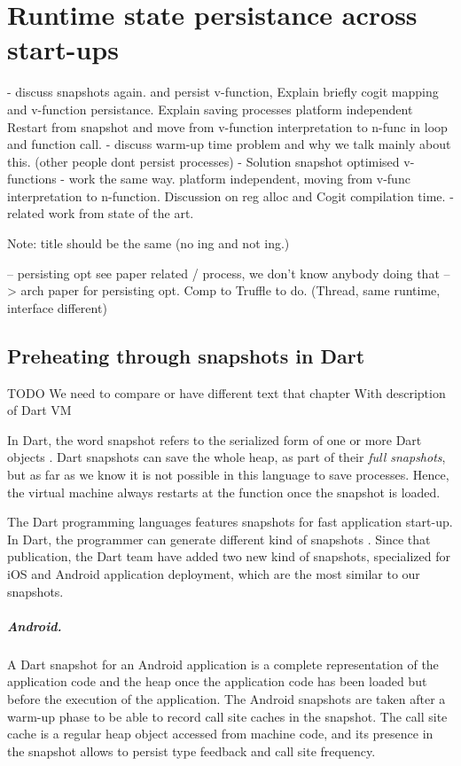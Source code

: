 \documentclass[a4paper,12pt,twoside]{../includes/ThesisStyle}
\begin{document}
\fi

\chapter{Runtime state persistance across start-ups}
\label{chap:persistance}
\minitoc

- discuss snapshots again. and persist v-function, 
Explain briefly cogit mapping and v-function persistance.
Explain saving processes
platform independent
Restart from snapshot and move from v-function interpretation to n-func in loop and function call.
- discuss warm-up time problem and why we talk mainly about this. (other people dont persist processes)
- Solution snapshot optimised v-functions - work the same way.
platform independent, moving from v-func interpretation to n-function.
Discussion on reg alloc and Cogit compilation time.
- related work
from state of the art.






Note: title should be the same (no ing and not ing.)

-- persisting opt see paper related / process, we don't know anybody doing that
--> arch paper for persisting opt. Comp to Truffle to do. (Thread, same runtime, interface different)

\section{Preheating through snapshots in Dart}

TODO
We need to compare or have different text that chapter With description of Dart VM


In Dart, the word snapshot refers to the serialized form of one or more Dart objects \cite{Anna13a}. Dart snapshots can save the whole heap, as part of their \emph{full snapshots}, but as far as we know it is not possible in this language to save processes. Hence, the virtual machine always restarts at the  function once the snapshot is loaded.


The Dart programming languages features snapshots for fast application start-up. In Dart, the programmer can generate different kind of snapshots \cite{Anna13a}. Since that publication, the Dart team have added two new kind of snapshots, specialized for iOS and Android application deployment, which are the most similar to our snapshots.

\paragraph{Android.} A Dart snapshot for an Android application is a complete representation of the application code and the heap once the application code has been loaded but before the execution of the application. The Android snapshots are taken after a warm-up phase to be able to record call site caches in the snapshot. The call site cache is a regular heap object accessed from machine code, and its presence in the snapshot allows to persist type feedback and call site frequency.
\end{document}

